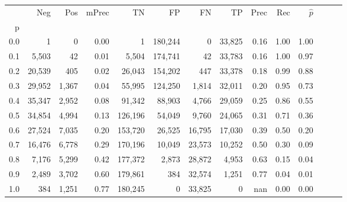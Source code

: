 \begin{tabular}{rrrrrrrrrrrrrr}
\toprule
{} &     Neg &    Pos & mPrec &       TN &       FP &      FN &      TP &  Prec &   Rec & $\hat{p}$ \\
p   &         &        &       &          &          &         &         &       &       &           \\
\midrule
0.0 &       1 &      0 &  0.00 &        1 &  180,244 &       0 &  33,825 &  0.16 &  1.00 &      1.00 \\
0.1 &   5,503 &     42 &  0.01 &    5,504 &  174,741 &      42 &  33,783 &  0.16 &  1.00 &      0.97 \\
0.2 &  20,539 &    405 &  0.02 &   26,043 &  154,202 &     447 &  33,378 &  0.18 &  0.99 &      0.88 \\
0.3 &  29,952 &  1,367 &  0.04 &   55,995 &  124,250 &   1,814 &  32,011 &  0.20 &  0.95 &      0.73 \\
0.4 &  35,347 &  2,952 &  0.08 &   91,342 &   88,903 &   4,766 &  29,059 &  0.25 &  0.86 &      0.55 \\
0.5 &  34,854 &  4,994 &  0.13 &  126,196 &   54,049 &   9,760 &  24,065 &  0.31 &  0.71 &      0.36 \\
0.6 &  27,524 &  7,035 &  0.20 &  153,720 &   26,525 &  16,795 &  17,030 &  0.39 &  0.50 &      0.20 \\
0.7 &  16,476 &  6,778 &  0.29 &  170,196 &   10,049 &  23,573 &  10,252 &  0.50 &  0.30 &      0.09 \\
0.8 &   7,176 &  5,299 &  0.42 &  177,372 &    2,873 &  28,872 &   4,953 &  0.63 &  0.15 &      0.04 \\
0.9 &   2,489 &  3,702 &  0.60 &  179,861 &      384 &  32,574 &   1,251 &  0.77 &  0.04 &      0.01 \\
1.0 &     384 &  1,251 &  0.77 &  180,245 &        0 &  33,825 &       0 &   nan &  0.00 &      0.00 \\
\bottomrule
\end{tabular}
